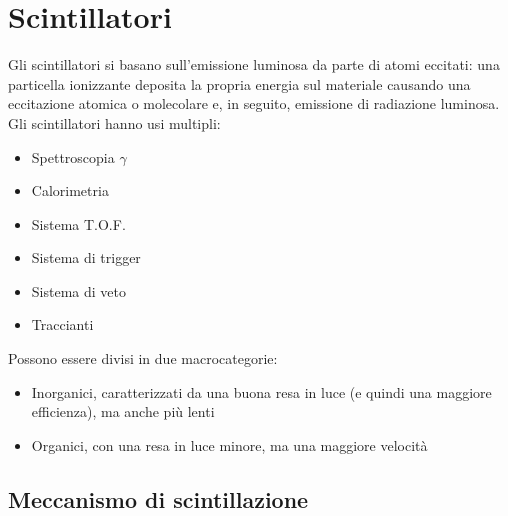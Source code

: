 \chapter{Scintillatori}
Gli scintillatori si basano sull'emissione luminosa da parte di atomi eccitati:
una particella ionizzante deposita la propria energia sul materiale causando una eccitazione atomica o molecolare e, in seguito,
emissione di radiazione luminosa.
Gli scintillatori hanno usi multipli:
\begin{itemize}
\item Spettroscopia $\gamma$
\item Calorimetria
\item Sistema T.O.F.
\item Sistema di trigger
\item Sistema di veto
\item Traccianti
\end{itemize} 
Possono essere divisi in due macrocategorie:
\begin{itemize}
\item Inorganici, caratterizzati da una buona resa in luce (e quindi una maggiore efficienza), ma anche pi\`u lenti
\item Organici, con una resa in luce minore, ma una maggiore velocit\`a
\end{itemize}
\section{Meccanismo di scintillazione}
